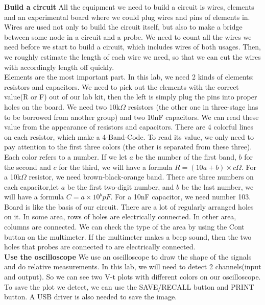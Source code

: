 \textbf{Build a circuit} \newline
\phantom{ } All the equipment we need to build a circuit is wires, elements and an experimental board where we could plug wires and pins of elements in.\\
\phantom{ } Wires are used not only to build the circuit itself, but also to make a bridge between some node in a circuit and a probe. We need to count all the wires we need before we start to build a circuit, which includes wires of both usages. Then, we roughly estimate the length of each wire we need, so that we can cut the wires with accordingly length off quickly.\\
\phantom{ } Elements are the most important part. In this lab, we need 2 kinds of elements: resistors and capacitors. We need to pick out the elements with the correct value(R or F) out of our lab kit, then the left is simply plug the pins into proper holes on the board. We need two 10k$\Omega$ resistors (the other one in three-stage has to be borrowed from another group) and two 10nF capacitors. We can read these value from the appearance of resistors and capacitors. There are 4 colorful lines on each resistor, which make a 4-Band-Code. To read its value, we only need to pay attention to the first three colors (the other is separated from these three). Each color refers to a number. If we let $a$ be the number of the first band, $b$ for the second and $c$ for the third, we will have a formula $R = (10a+b)\times c\Omega$. For a 10k$\Omega$ resistor, we need brown-black-orange band. There are three numbers on each capacitor,let $a$ be the first two-digit number, and $b$ be the last number, we will have a formula $C = a \times 10^b pF$. For a 10nF capacitor, we need number 103.\\
\phantom{ } Board is like the basis of our circuit. There are a lot of regularly arranged holes on it. In some area, rows of holes are electrically connected. In other area, columns are connected. We can check the type of the area by using the Cont button on the multimeter. If the multimeter makes a beep sound, then the two holes that probes are connected to are electrically connected.\\
\textbf{Use the oscilloscope} \newline
\phantom{ } We use an oscilloscope to draw the shape of the signals and do relative measurements. In this lab, we will need to detect 2 channels(input and output). So we can see two V-t plots with different colors on our oscilloscope. To save the plot we detect, we can use the SAVE/RECALL button and PRINT button. A USB driver is also needed to save the image.\\
